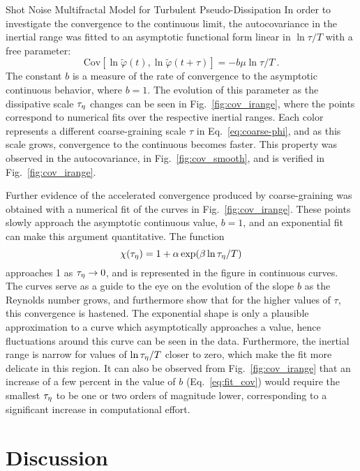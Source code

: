 \begin{chapter}{Shot Noise Multifractal Model for Turbulent Pseudo-Dissipation}
In order to investigate the convergence to the continuous limit, the autocovariance in the inertial range was fitted to an asymptotic functional form linear in $\ln\tau/T$ with a free parameter:
\begin{equation} \label{eq:fit_cov}
    \mathrm{Cov}[\ln \tilde\varphi(t),\ln \tilde\varphi(t+\tau)]
    = - b \mu \ln \tau/T \ .
\end{equation}
The constant $b$ is a measure of the rate of convergence to the asymptotic continuous behavior, where $b=1$. The evolution of this parameter as the dissipative scale $\tau_{\eta}$ changes can be seen in Fig.~\ref{fig:cov_irange}, where the points correspond to numerical fits over the respective inertial ranges. Each color represents a different coarse-graining scale $\tau$ in Eq.~\eqref{eq:coarse-phi}, and as this scale grows, convergence to the continuous becomes faster. This property was observed in the autocovariance, in Fig.~\ref{fig:cov_smooth}, and is verified in Fig.~\ref{fig:cov_irange}.

Further evidence of the accelerated convergence produced by coarse-graining was obtained with a numerical fit of the curves in Fig.~\ref{fig:cov_irange}. These points slowly approach the asymptotic continuous value, $b=1$, and an exponential fit can make this argument quantitative. The function
\begin{equation} \label{eq:b_exp_fit}
    \chi(\tau_{\eta}) = 1 + \alpha \exp(\beta \ln \tau_{\eta}/T)
\end{equation}
approaches 1 as $\tau_{\eta} \to 0$, and is represented in the figure in continuous curves. The curves serve as a guide to the eye on the evolution of the slope $b$ as the Reynolds number grows, and furthermore show that for the higher values of $\tau$, this convergence is hastened. The exponential shape is only a plausible approximation to a curve which asymptotically approaches a value, hence fluctuations around this curve can be seen in the data. Furthermore, the inertial range is narrow for values of $\ln\tau_{\eta}/T$ closer to zero, which make the fit more delicate in this region. It can also be observed from Fig.~\ref{fig:cov_irange} that an increase of a few percent in the value of $b$ (Eq.~\ref{eq:fit_cov}) would require the smallest $\tau_{\eta}$ to be one or two orders of magnitude lower, corresponding to a significant increase in computational effort.

\section{Discussion}


\end{chapter}
